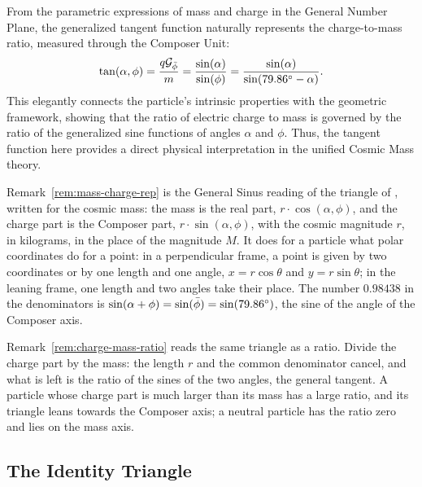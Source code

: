 \begin{remark}\label{rem:charge-mass-ratio}
From the parametric expressions of mass and charge in the General Number Plane, the generalized tangent function naturally represents the charge-to-mass ratio, measured through the Composer Unit:
\[
\tan(\alpha, \phi) = \frac{q\mathcal{G}_{\bar{\phi}}}{m} = \frac{\sin(\alpha)}{\sin(\phi)} = \frac{\sin(\alpha)}{\sin(79.86^\circ - \alpha)} .
\]
This elegantly connects the particle's intrinsic properties with the geometric framework, showing that the ratio of electric charge to mass is governed by the ratio of the generalized sine functions of angles $\alpha$ and $\phi$. Thus, the tangent function here provides a direct physical interpretation in the unified Cosmic Mass theory.
\end{remark}

\begin{plainwords}
Remark~\ref{rem:mass-charge-rep} is the General Sinus reading of the triangle of , written for the cosmic mass: the mass is the real part, $r \cdot \cos(\alpha, \phi)$, and the charge part is the Composer part, $r \cdot \sin(\alpha, \phi)$, with the cosmic magnitude $r$, in kilograms, in the place of the magnitude $M$. It does for a particle what polar coordinates do for a point: in a perpendicular frame, a point is given by two coordinates or by one length and one angle, $x = r\cos\theta$ and $y = r\sin\theta$; in the leaning frame, one length and two angles take their place. The number $0.98438$ in the denominators is $\sin(\alpha + \phi) = \sin(\bar{\phi}) = \sin(79.86^\circ)$, the sine of the angle of the Composer axis.

Remark~\ref{rem:charge-mass-ratio} reads the same triangle as a ratio. Divide the charge part by the mass: the length $r$ and the common denominator cancel, and what is left is the ratio of the sines of the two angles, the general tangent. A particle whose charge part is much larger than its mass has a large ratio, and its triangle leans towards the Composer axis; a neutral particle has the ratio zero and lies on the mass axis.
\end{plainwords}

\subsection{The Identity Triangle}\label{subsec:id-triangle}

